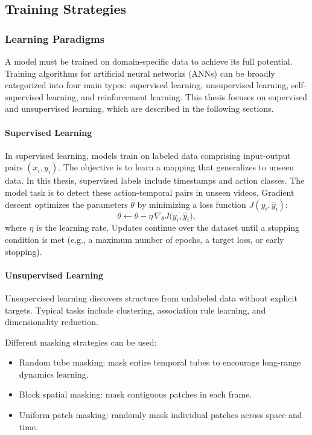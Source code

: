 \subsection{Training Strategies}
\label{ssec:training_stratergies}

\subsubsection{Learning Paradigms}
A model must be trained on domain-specific data to achieve its full potential. Training algorithms for artificial neural networks (ANNs) can be broadly categorized into four main types: supervised learning, unsupervised learning, self-supervised learning, and reinforcement learning. This thesis focuses on supervised and unsupervised learning, which are described in the following sections.

\paragraph{Supervised Learning}
In supervised learning, models train on labeled data comprising input-output pairs \((x_i, y_i)\). The objective is to learn a mapping that generalizes to unseen data. In this thesis, supervised labels include timestamps and action classes. The model task is to detect these action-temporal pairs in unseen videos. Gradient descent optimizes the parameters \(\theta\) by minimizing a loss function \(J(y_i, \hat y_i)\):  
\[
\theta \leftarrow \theta - \eta \,\nabla_{\theta}J\bigl(y_i,\hat y_i\bigr),
\]
where \(\eta\) is the learning rate. Updates continue over the dataset until a stopping condition is met (e.g., a maximum number of epochs, a target loss, or early stopping).

\paragraph{Unsupervised Learning}
Unsupervised learning discovers structure from unlabeled data without explicit targets. Typical tasks include clustering, association rule learning, and dimensionality reduction. 

Different masking strategies can be used:
\begin{itemize}
    \item Random tube masking: mask entire temporal tubes to encourage long-range dynamics learning.
    \item Block spatial masking: mask contiguous patches in each frame.
    \item Uniform patch masking: randomly mask individual patches across space and time.
\end{itemize}

